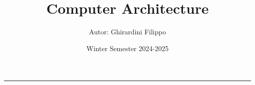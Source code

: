 \documentclass[a4paper,10pt]{article}
\title{\textbf{Computer Architecture}}
\author{Autor: Ghirardini Filippo}
\date{Winter Semester 2024-2025}
\theoremstyle{remark}
\theoremstyle{definition}
\theoremstyle{plain}
\theoremstyle{definition}
\theoremstyle{definition}
\theoremstyle{definition}
\theoremstyle{plain}
\theoremstyle{plain}
\begin{document}


\tableofcontents
\newpage
\maketitle
\begin{center}
    \vspace{-20pt}
    \rule{11cm}{.1pt} 
\end{center}
\newpage



\end{document}
